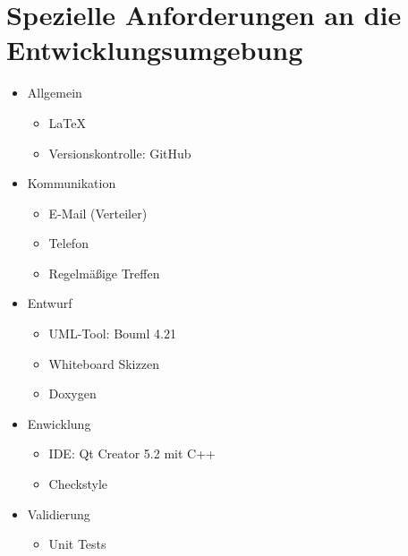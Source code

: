 \section{Spezielle Anforderungen an die Entwicklungsumgebung}

\begin{itemize}
  \item Allgemein
    \begin{itemize}
      \item \LaTeX
      \item Versionskontrolle: GitHub
    \end{itemize}
  \item Kommunikation
    \begin{itemize}
      \item E-Mail (Verteiler)
      \item Telefon
      \item Regelmäßige Treffen
    \end{itemize}
  \item Entwurf
    \begin{itemize}
      \item UML-Tool: Bouml 4.21
      \item Whiteboard Skizzen
      \item Doxygen
    \end{itemize}
  \item Enwicklung
    \begin{itemize}
      \item IDE: Qt Creator 5.2 mit C++
      \item Checkstyle
    \end{itemize}
  \item Validierung
    \begin{itemize}
      \item Unit Tests
    \end{itemize}
\end{itemize}


